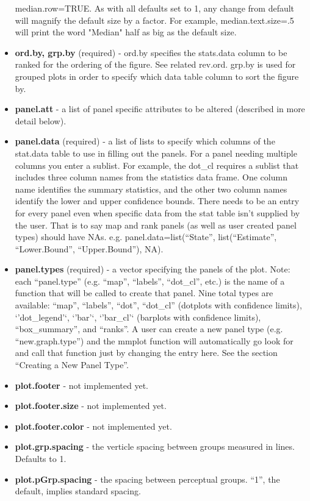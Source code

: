 \documentclass{article}
\begin{document}
\begin{itemize}
median.row=TRUE. As with all defaults set to 1, any change from default will magnify the default size by a factor.  For example, median.text.size=.5 will print the word "Median" half as big as the default size.
\item  \textbf{ord.by, grp.by} (required) - ord.by specifies the stats.data column to be ranked for the ordering of the figure. See related rev.ord.  grp.by is used for grouped plots in order to specify which data table column to sort the figure by.
\item  \textbf{panel.att} - a list of panel specific attributes to be altered (described in more detail below).
\item  \textbf{panel.data} (required) - a list of lists to specify which columns of the stat.data table to use in filling out the panels. For a panel needing multiple columns you enter a sublist. For example, the dot\_cl requires a sublist that includes three column names from the statistics data frame.  One column name identifies the summary statistics, and the other two column names identify the lower and upper confidence bounds.  There needs to be an entry for every panel even when specific data from the stat table isn't supplied by the user. That is to say map and rank panels (as well as user created panel types) should have NAs. e.g. panel.data=list(``State'', list(``Estimate'', ``Lower.Bound'', ``Upper.Bound''), NA).
\item  \textbf{panel.types} (required) - a vector specifying the panels of the plot. Note: each ``panel.type'' (e.g. ``map'', ``labels'', ``dot\_cl'', etc.) is the name of a function that will be called to create that panel.  Nine total types are available: ``map'', ``labels'', ``dot'', ``dot\_cl'' (dotplots with confidence limits), `'dot\_legend'`, `'bar'`, `'bar\_cl'` (barplots with confidence limits), ``box\_summary'', and ``ranks''. A user can create a new panel type (e.g. ``new.graph.type'') and the mmplot function will automatically go look for and call that function just by changing the entry here. See the section ``Creating a New Panel Type''.
\item  \textbf{plot.footer} - not implemented yet.
\item  \textbf{plot.footer.size} - not implemented yet.
\item  \textbf{plot.footer.color} - not implemented yet.
\item  \textbf{plot.grp.spacing} - the verticle spacing between groups measured in lines. Defaults to 1.
\item  \textbf{plot.pGrp.spacing} - the spacing between perceptual groups. ``1'', the default, implies standard spacing.

\end{itemize}
\end{document}
